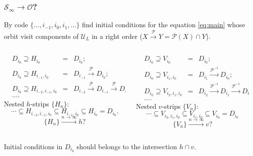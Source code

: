 \documentclass [10pt] {beamer}
\begin{document}
\begin{frame}
	\frametitle{$\mathcal{S}_{\infty} \to \mathcal{O}$?}
	By code $\{\dots, i_{-1}, i_0, i_1, \dots\}$ find initial conditions for the equation \eqref{eq:main} whose orbit visit components of $\mathscr{U}_L$ in a right order ($X \xrightarrow{\mathcal{P}} Y = \mathcal{P}(X) \cap Y$).
	\begin{columns}[T]
		\begin{column}{.5\textwidth}
			\begin{alignat*}{2}
				& D_{i_0} \supseteq H_{i_0} & = & D_{i_0}; \\[3pt]
				& D_{i_0} \supseteq H_{i_{-1}, i_0} & = & D_{i_{-1}} \xrightarrow{\mathcal{P}} D_{i_0}; \\[3pt]
				& D_{i_0} \supseteq H_{i_{-2}, i_{-1}, i_0} & = & D_{i_{-2}} \xrightarrow{\mathcal{P}} D_{i_{-1}} \xrightarrow{\mathcal{P}} D_{i_0}; \\[3pt]
				& \dots.
			\end{alignat*}
			Nested $h$-strips $\{H_n\}$:
			$$\cdots \subseteq H_{i_{-2}, i_{-1}, i_0} \subseteq H_{i_{-1}, i_0} \subseteq H_{i_0} = D_{i_0}.$$ 
			$$\{ H_n \} \xrightarrow{n \to \infty} h?$$
		\end{column}
		\hfill
		\begin{column}{.5\textwidth}
			\begin{alignat*}{2}
				& D_{i_0} \supseteq V_{i_0} & = & D_{i_0}; \\[2pt]
				& D_{i_0} \supseteq V_{i_1, i_0} & = & D_{i_1} \xrightarrow{\mathcal{P}^{-1}} D_{i_0}; \\[2pt]
				& D_{i_0} \supseteq V_{i_2, i_1, i_0} & = & D_{i_2} \xrightarrow{\mathcal{P}^{-1}} D_{i_1} \xrightarrow{\mathcal{P}^{-1}} D_{i_0}; \\[2pt]
				& \dots.
			\end{alignat*}
			Nested $v$-strips $\{V_n\}$:
			\begin{equation*}
				\cdots \subseteq V_{i_2, i_1, i_0} \subseteq V_{i_1, i_0} \subseteq V_{i_0} = D_{i_0}	
			\end{equation*}
			\begin{equation*}
				\{ V_n \} \xrightarrow{n \to \infty} v?		
			\end{equation*}
		\end{column}
	\end{columns}
	\vspace{10pt}
	\begin{center}
		Initial conditions in $D_{i_0}$ should belongs to the intersection $h \cap v$.
	\end{center}
\end{frame}
\end{document}
